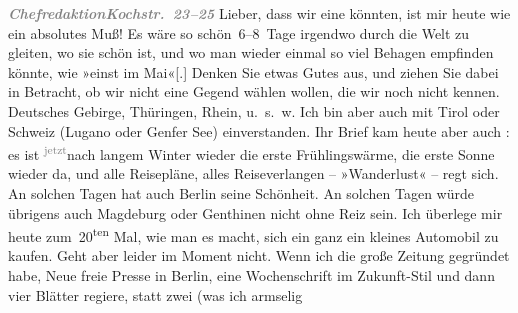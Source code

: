 \pstart
           \textcolor{gray}{\textbf{\emph{Chefredaktion}}}\hfill \textcolor{gray}{\textbf{\emph{Kochstr. 23–25}}}\pend
           \vspace{0.5em}
\pstart
           Lieber, dass wir eine \label{K_L03416-1v}\label{K_L03416-1} könnten, ist
               mir heute wie ein absolutes Muß! Es wäre so schön 6–8 Tage irgendwo durch die Welt zu
               gleiten, wo sie schön ist, und wo man wieder einmal so viel Behagen empfinden könnte,
               wie »einst im Mai«{[}.{]} Denken Sie etwas Gutes aus, und ziehen Sie
               dabei in Betracht, ob wir nicht eine Gegend wählen wollen, die wir noch nicht kennen.
               Deutsches Gebirge, Thüringen, Rhein, u. s. w. Ich bin aber auch mit Tirol oder Schweiz (Lugano oder Genfer See) einverstanden. Ihr Brief kam heute aber auch \label{K_L03416-2v}\label{K_L03416-2}: es
               ist \substVorne{}\textsuperscript{\textcolor{gray}{jetzt}}\substDazwischen{}nach\substHinten{} langem Winter wieder die erste Frühlingswärme, die erste Sonne wieder da,
               und alle Reisepläne, alles Reiseverlangen – »Wanderlust« – regt sich. An solchen
               Tagen hat auch Berlin seine Schönheit. An solchen
               Tagen würde übrigens auch Magdeburg oder Genthinen nicht ohne Reiz sein. Ich überlege mir
               heute zum 20\textsuperscript{ten} Mal, wie man es macht, sich ein ganz ein
               kleines Automobil zu kaufen. Geht aber leider im Moment nicht. Wenn ich die große
               Zeitung gegründet habe, Neue freie Presse in Berlin, eine Wochenschrift im Zukunft-Stil und dann vier Blätter regiere, statt zwei (was ich armselig
